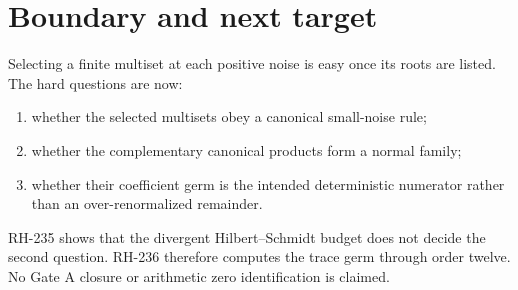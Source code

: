\documentclass[11pt]{article}
\theoremstyle{remark}
\begin{document}
\section{Boundary and next target}

Selecting a finite multiset at each positive noise is easy once its roots are
listed.  The hard questions are now:
\begin{enumerate}[leftmargin=2em]
\item whether the selected multisets obey a canonical small-noise rule;
\item whether the complementary canonical products form a normal family;
\item whether their coefficient germ is the intended deterministic
numerator rather than an over-renormalized remainder.
\end{enumerate}

RH-235 shows that the divergent Hilbert--Schmidt budget does not decide the
second question.  RH-236 therefore computes the trace germ through order
twelve.  No Gate A closure or arithmetic zero identification is claimed.



\end{document}
